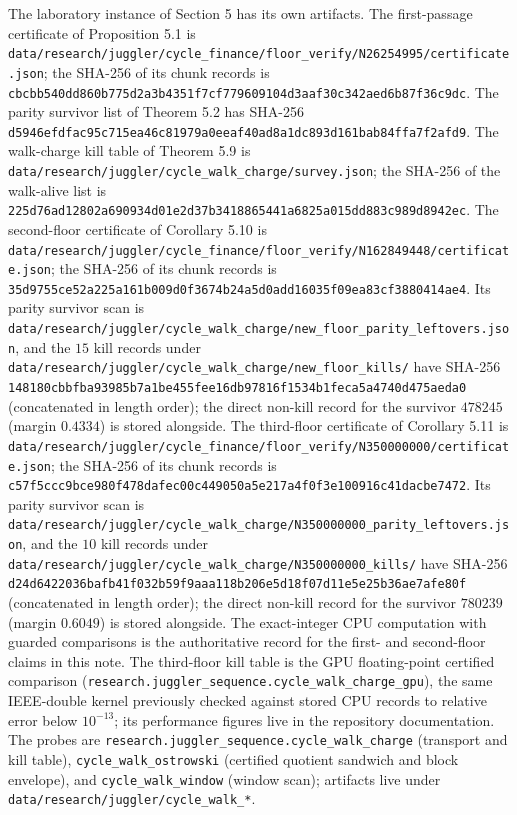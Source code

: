 \documentclass[12pt]{article}
\begin{document}
The laboratory instance of Section 5 has its own artifacts. The
first-passage certificate of Proposition 5.1 is
\texttt{\nolinkurl{data/research/juggler/cycle_finance/floor_verify/N26254995/certificate.json}};
the SHA-256 of its chunk records is
\texttt{\nolinkurl{cbcbb540dd860b775d2a3b4351f7cf779609104d3aaf30c342aed6b87f36c9dc}}.
The parity survivor list of Theorem 5.2 has SHA-256
\texttt{\nolinkurl{d5946efdfac95c715ea46c81979a0eeaf40ad8a1dc893d161bab84ffa7f2afd9}}.
The walk-charge kill table of Theorem 5.9 is
\texttt{\nolinkurl{data/research/juggler/cycle_walk_charge/survey.json}};
the SHA-256 of the walk-alive list is
\texttt{\nolinkurl{225d76ad12802a690934d01e2d37b3418865441a6825a015dd883c989d8942ec}}.
The second-floor certificate of Corollary 5.10 is
\texttt{\nolinkurl{data/research/juggler/cycle_finance/floor_verify/N162849448/certificate.json}};
the SHA-256 of its chunk records is
\texttt{\nolinkurl{35d9755ce52a225a161b009d0f3674b24a5d0add16035f09ea83cf3880414ae4}}.
Its parity survivor scan is
\texttt{\nolinkurl{data/research/juggler/cycle_walk_charge/new_floor_parity_leftovers.json}},
and the \(15\) kill records under
\texttt{\nolinkurl{data/research/juggler/cycle_walk_charge/new_floor_kills/}}
have SHA-256
\texttt{\nolinkurl{148180cbbfba93985b7a1be455fee16db97816f1534b1feca5a4740d475aeda0}}
(concatenated in length order); the direct non-kill record for the
survivor \(478245\) (margin \(0.4334\)) is stored alongside. The
third-floor certificate of Corollary 5.11 is
\texttt{\nolinkurl{data/research/juggler/cycle_finance/floor_verify/N350000000/certificate.json}};
the SHA-256 of its chunk records is
\texttt{\nolinkurl{c57f5ccc9bce980f478dafec00c449050a5e217a4f0f3e100916c41dacbe7472}}.
Its parity survivor scan is
\texttt{\nolinkurl{data/research/juggler/cycle_walk_charge/N350000000_parity_leftovers.json}},
and the \(10\) kill records under
\texttt{\nolinkurl{data/research/juggler/cycle_walk_charge/N350000000_kills/}}
have SHA-256
\texttt{\nolinkurl{d24d6422036bafb41f032b59f9aaa118b206e5d18f07d11e5e25b36ae7afe80f}}
(concatenated in length order); the direct non-kill record for the
survivor \(780239\) (margin \(0.6049\)) is stored alongside. The
exact-integer CPU computation with guarded comparisons is the
authoritative record for the first- and second-floor claims in this
note. The third-floor kill table is the GPU floating-point certified
comparison
(\texttt{\nolinkurl{research.juggler_sequence.cycle_walk_charge_gpu}}),
the same IEEE-double kernel previously checked against stored CPU
records to relative error below \(10^{-13}\); its performance figures
live in the repository documentation. The probes are
\texttt{\nolinkurl{research.juggler_sequence.cycle_walk_charge}}
(transport and kill table), \texttt{\nolinkurl{cycle_walk_ostrowski}}
(certified quotient sandwich and block envelope), and
\texttt{\nolinkurl{cycle_walk_window}} (window scan); artifacts live
under \texttt{\nolinkurl{data/research/juggler/cycle_walk_*}}.
\end{document}
